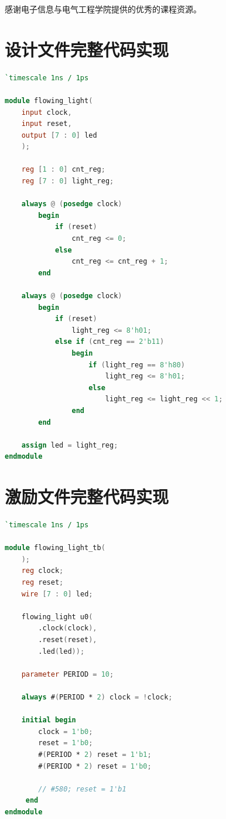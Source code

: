 \documentclass{cumcm}
\numberwithin{equation}{section}
\numberwithin{equation}{subsection}
\begin{document}
感谢电子信息与电气工程学院提供的优秀的课程资源。
%
%

\clearpage
\begin{appendices}
\section{设计文件完整代码实现}\label{appsection1}
\begin{lstlisting}[language=verilog]
`timescale 1ns / 1ps

module flowing_light(
    input clock,
    input reset,
    output [7 : 0] led
    );
    
    reg [1 : 0] cnt_reg;
    reg [7 : 0] light_reg;
    
    always @ (posedge clock)
        begin
            if (reset)
                cnt_reg <= 0;
            else
                cnt_reg <= cnt_reg + 1;
        end
    
    always @ (posedge clock)
        begin
            if (reset)
                light_reg <= 8'h01;
            else if (cnt_reg == 2'b11)
                begin
                    if (light_reg == 8'h80)
                        light_reg <= 8'h01;
                    else 
                        light_reg <= light_reg << 1;
                end
        end
    
    assign led = light_reg;
endmodule
\end{lstlisting}
\clearpage
\section{激励文件完整代码实现}\label{appsection2}
\begin{lstlisting}[language=verilog]
`timescale 1ns / 1ps

module flowing_light_tb(
    );
    reg clock;
    reg reset;
    wire [7 : 0] led;
    
    flowing_light u0(
        .clock(clock),
        .reset(reset),
        .led(led));
    
    parameter PERIOD = 10;
    
    always #(PERIOD * 2) clock = !clock;
    
    initial begin
        clock = 1'b0;
        reset = 1'b0;
        #(PERIOD * 2) reset = 1'b1;
        #(PERIOD * 2) reset = 1'b0;
        
        // #580; reset = 1'b1
     end
endmodule
\end{lstlisting}
\end{appendices}
\end{document}
